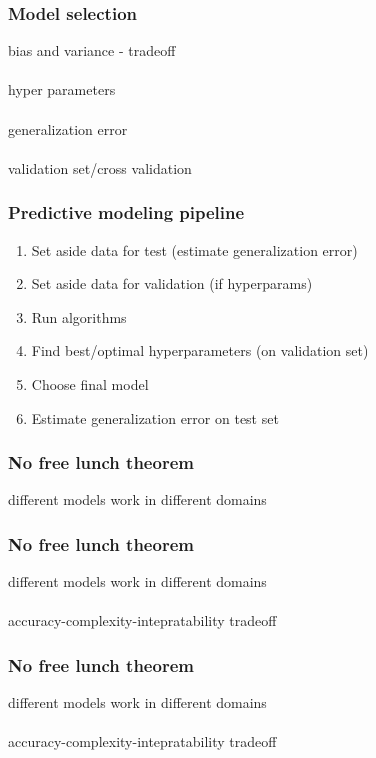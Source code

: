 \documentclass{beamer}
\begin{document}
\begin{frame}
	\frametitle{Model selection}
	\begin{center}
		bias and variance - tradeoff\\~\\
		hyper parameters\\~\\
		generalization error\\~\\
		validation set/cross validation
	\end{center}
\end{frame}

\begin{frame}
	\frametitle{Predictive modeling pipeline}
	\begin{center}
		\begin{enumerate}
			\item Set aside data for test (estimate generalization error)
			\item Set aside data for validation (if hyperparams)
			\item Run algorithms
			\item Find best/optimal hyperparameters (on validation set)
			\item Choose final model
			\item Estimate generalization error on test set
		\end{enumerate}
	\end{center}
\end{frame}

\begin{frame}
	\frametitle{No free lunch theorem}
	\begin{center}
		different models work in different domains
	\end{center}
\end{frame}

\begin{frame}
	\frametitle{No free lunch theorem}
	\begin{center}
		different models work in different domains\\~\\
		accuracy-complexity-intepratability tradeoff
	\end{center}
\end{frame}

\begin{frame}
	\frametitle{No free lunch theorem}
	\begin{center}
		different models work in different domains\\~\\
		accuracy-complexity-intepratability tradeoff
	\end{center}
\end{frame}
\end{document}
